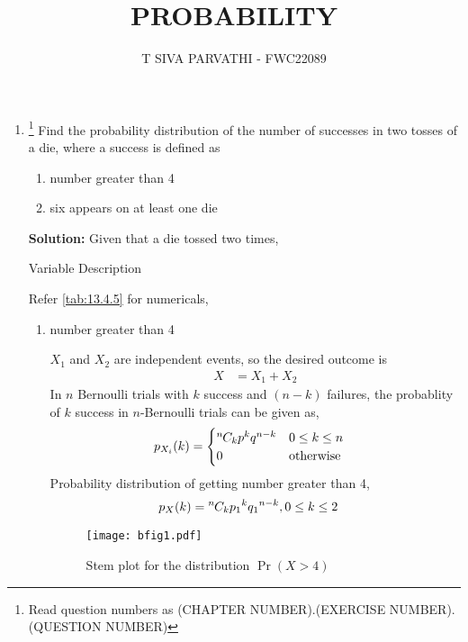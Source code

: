 \documentclass{article}
\providecommand{\pr}[1]{\ensuremath{\Pr\left(#1\right)}}
\newcommand{\solution}{\noindent \textbf{Solution: }}
\newcommand*{\permcomb}[4][0mu]{{{}^{#3}\mkern#1#2_{#4}}}
\newcommand*{\comb}[1][-1mu]{\permcomb[#1]{C}}
\providecommand{\pr}[1]{\ensuremath{\Pr\left(#1\right)}}
\begin{document}
\title{PROBABILITY}
\author{\Large T SIVA PARVATHI - FWC22089}
\date{}

\maketitle
\begin{enumerate}[label=13.\arabic{enumi}.\arabic{enumii}]%
\setcounter{enumi}{3}
\setcounter{enumii}{5}

\item \footnote{Read question numbers as (CHAPTER NUMBER).(EXERCISE NUMBER).(QUESTION NUMBER)}
Find the probability distribution of the number of successes in two tosses of a die, where a success is defined as
\begin{enumerate}
\item number greater than 4
\item six appears on at least one die
\end{enumerate}

\solution
Given that a die tossed two times,
\begin{table}[h]\centering
	
	 \caption{Variable Description}
	 \label{tab:13.4.5}
\end{table}

Refer \ref{tab:13.4.5} for numericals,
\begin{enumerate}
\item number greater than 4

$X_1$ and $X_2$ are independent events, so the desired outcome is
\begin{align}
X&=X_1+X_2
\end{align}
In $n$ Bernoulli trials with $k$ success and $(n - k)$ failures, the probablity of $k$ success in $n$-Bernoulli trials can be given as,
\begin{align}
p_{X_i}(k)   &= 
\begin{cases}
\comb{n}{k}{p}^{k}{q}^{n-k} & 0 \le k \le n\\
0 & \text{otherwise}                
\end{cases}
\end{align}
Probability distribution of getting number greater than 4,
\begin{align}
p_X(k)   &= \comb{n}{k}{p_1}^{k}{q_1}^{n-k}, 0 \le k \le 2
\end{align}

\begin{figure}
\centering
\texttt{[image: bfig1.pdf]}
\caption{Stem plot for the distribution $\pr{X>4}$}
\label{fig:Plot}
\end{figure}


\end{enumerate}
\end{enumerate}
\end{document}

